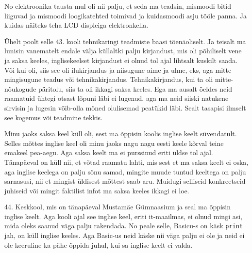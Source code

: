 No elektroonika tausta mul oli nii palju, et seda ma teadsin, mismoodi bitid 
liiguvad ja mismoodi  loogikatehted toimivad ja kuidasmoodi asju tööle panna. 
Ja kuidas näiteks teha LCD displeiga elektronkella.  


Ühelt poolt selle 43. kooli tehnikaringi teadmiste baasi tõenäoliselt. Ja teisalt ma lunisin vanematelt 
endale välja küllaltki palju kirjandust, mis oli põhiliselt vene ja saksa 
keeles, inglisekeelset kirjandust ei olnud tol ajal lihtsalt kuskilt saada. Või 
kui oli, siis see oli ilukirjandus ja niisugune aime ja ulme, eks, aga mitte 
mingisugune teadus või tehnikakirjandus. Tehnikakirjandus, kui ta oli 
mitte-nõukogude päritolu, siis ta oli ikkagi saksa keeles. Ega ma ausalt öeldes 
neid raamatuid ühtegi otsast lõpuni läbi ei lugenud, aga ma neid siiski 
natukene sirvisin ja  lugesin võib-olla mõned olulisemad peatükid läbi. Sealt 
tasapisi ilmselt see kogemus või  teadmine tekkis.


Minu jaoks saksa keel küll oli, sest ma õppisin koolis inglise keelt 
süvendatult. Selles mõttes inglise keel oli  minu jaoks nagu nagu eesti keele 
kõrval teine emakeel pea-aegu. Aga saksa keelt ma ei purssinud eriti üldse tol 
ajal. Tänapäeval on küll nii, et võtad raamatu lahti, mis sest et ma saksa 
keelt ei oska, aga  inglise keelega on palju sõnu samad, mingite muude tuntud 
keeltega on palju sarnasusi, nii et mingist üldisest mõttest saab aru. Muidugi 
selliseid konkreetseid juhiseid või mingit faktilist infot ma saksa keeles 
ikkagi ei loe. 


44. Keskkool, mis on tänapäeval Mustamäe 
Gümnaasium 
ja seal ma õppisin inglise keelt. Aga kooli ajal see inglise keel, eriti 
it-maailmas, ei olnud mingi asi, mida oleks saanud väga palju rakendada. No 
peale selle, Basicu-s on käsk \verb|print| jah, on küll inglise keeles. Aga 
Basic-us neid käske nii väga palju ei ole ja neid ei ole keeruline ka pähe 
õppida juhul, kui sa inglise keelt ei valda. 



